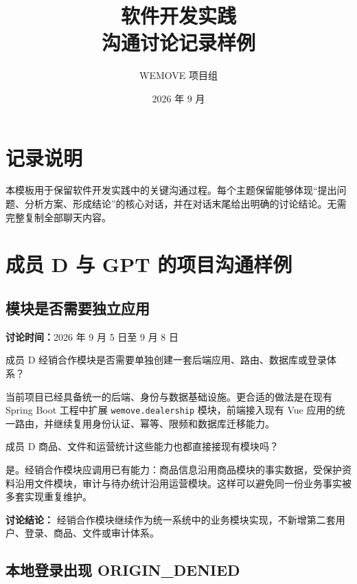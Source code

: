 \documentclass[12pt,a4paper]{ctexart}
\title{软件开发实践\\沟通讨论记录样例}
\author{WEMOVE 项目组}
\date{2026 年 9 月}
\begin{document}
\maketitle

\section{记录说明}

本模板用于保留软件开发实践中的关键沟通过程。每个主题保留能够体现“提出问题、分析方案、形成结论”的核心对话，并在对话末尾给出明确的讨论结论。无需完整复制全部聊天内容。

\section{成员 D 与 GPT 的项目沟通样例}

\subsection{模块是否需要独立应用}

\noindent
\textbf{讨论时间：}2026 年 9 月 5 日至 9 月 8 日

\begin{membermsg}{成员 D}
经销合作模块是否需要单独创建一套后端应用、路由、数据库或登录体系？
\end{membermsg}

\begin{gptmsg}
当前项目已经具备统一的后端、身份与数据基础设施。更合适的做法是在现有 Spring Boot 工程中扩展 \texttt{wemove.dealership} 模块，前端接入现有 Vue 应用的统一路由，并继续复用身份认证、幂等、限频和数据库迁移能力。
\end{gptmsg}

\begin{membermsg}{成员 D}
商品、文件和运营统计这些能力也都直接接现有模块吗？
\end{membermsg}

\begin{gptmsg}
是。经销合作模块应调用已有能力：商品信息沿用商品模块的事实数据，受保护资料沿用文件模块，审计与待办统计沿用运营模块。这样可以避免同一份业务事实被多套实现重复维护。
\end{gptmsg}

\begin{decisionbox}
\textbf{讨论结论：}
经销合作模块继续作为统一系统中的业务模块实现，不新增第二套用户、登录、商品、文件或审计体系。
\end{decisionbox}


\subsection{本地登录出现 ORIGIN\_DENIED}
\end{document}

